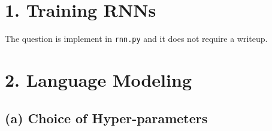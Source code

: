 \documentclass{article}
\begin{document}




\section*{1. Training RNNs }

The question is implement in \texttt{rnn.py} and it does not require a writeup.

\section*{2. Language Modeling}
\subsection*{(a) Choice of Hyper-parameters}
\end{document}
